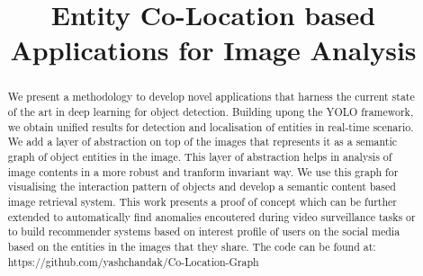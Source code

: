 \documentclass[conference]{IEEEtran}
\begin{document}
%
\title{Entity Co-Location based Applications for Image Analysis}


\author{
\and
{}
}


\maketitle


\begin{abstract}
We present a methodology to develop novel applications that harness the current state of the art in deep learning for object detection. Building upong the YOLO framework, we obtain unified results for detection and localisation of entities in real-time scenario. We add a layer of abstraction on top of the images that represents it as a semantic graph of object entities in the image. This layer of abstraction helps in analysis of image contents in a more robust and tranform invariant way.  We use this graph for visualising the interaction pattern of objects and develop a semantic content based image retrieval system. This work presents a proof of concept which can be further extended to automatically find anomalies encoutered during video surveillance tasks or to build recommender systems based on interest profile of users on the social media based on the entities in the images that they share. The code can be found at:
https://github.com/yashchandak/Co-Location-Graph \\

\end{abstract}
\end{document}
